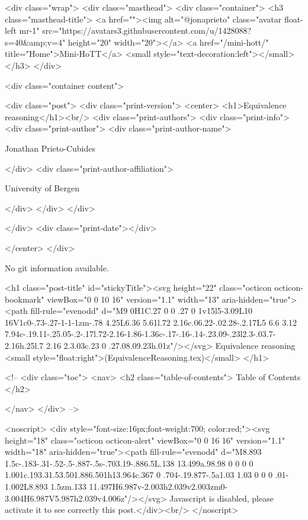     <div class="wrap">
      <div class="masthead">
        <div class="container">
          <h3 class="masthead-title">
            <a href=""><img alt="@jonaprieto" class="avatar float-left mr-1" src="https://avatars3.githubusercontent.com/u/1428088?s=40&amp;v=4" height="20" width="20"></a>
            <a href="/mini-hott/" title="Home">Mini-HoTT</a>
            <small style="text-decoration:left"></small>
          </h3>
        </div>
      
      <div class="container content">
        







<div class="post">
  <div class="print-version">
    <center>
      <h1>Equivalence reasoning</h1><br/>
        <div class="print-authors">
          <div class="print-info">
            <div class="print-author">
              <div class="print-author-name">
                
                  Jonathan Prieto-Cubides
                
              </div>
              <div class="print-author-affiliation">
                
                  University of Bergen
                
                </div>
            </div>
          </div>
          
          
        </div>
        <div class="print-date"></div>
        
        
    </center>
  </div>

  
  No git information available.
  

  <h1 class="post-title" id="stickyTitle"><svg height="22" class="octicon octicon-bookmark" viewBox="0 0 10 16" version="1.1" width="13" aria-hidden="true"><path fill-rule="evenodd" d="M9 0H1C.27 0 0 .27 0 1v15l5-3.09L10 16V1c0-.73-.27-1-1-1zm-.78 4.25L6.36 5.61l.72 2.16c.06.22-.02.28-.2.17L5 6.6 3.12 7.94c-.19.11-.25.05-.2-.17l.72-2.16-1.86-1.36c-.17-.16-.14-.23.09-.23l2.3-.03.7-2.16h.25l.7 2.16 2.3.03c.23 0 .27.08.09.23h.01z"/></svg> Equivalence reasoning <small style="float:right">(EquivalenceReasoning.tex)</small>
  </h1>

  <!-- 
  <div class="toc">
    <nav>
    <h2 class="table-of-contents"> Table of Contents </h2>
      

    </nav>
  </div>
   -->

  <noscript>
  <div style="font-size:16px;font-weight:700; color:red;"><svg height="18" class="octicon octicon-alert" viewBox="0 0 16 16" version="1.1" width="18" aria-hidden="true"><path fill-rule="evenodd" d="M8.893 1.5c-.183-.31-.52-.5-.887-.5s-.703.19-.886.5L.138 13.499a.98.98 0 0 0 0 1.001c.193.31.53.501.886.501h13.964c.367 0 .704-.19.877-.5a1.03 1.03 0 0 0 .01-1.002L8.893 1.5zm.133 11.497H6.987v-2.003h2.039v2.003zm0-3.004H6.987V5.987h2.039v4.006z"/></svg> Javascript is disabled, please activate it to see correctly this post.</div><br/>
  </noscript>

